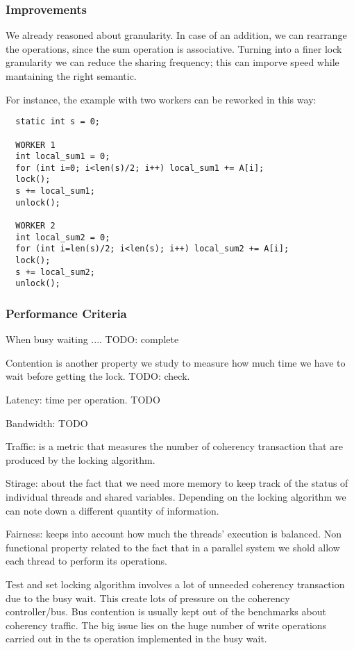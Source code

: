 \subsubsection{Improvements}
We already reasoned about granularity. In case of an addition, we can rearrange the operations, since the sum operation is associative.
Turning into a finer lock granularity we can reduce the sharing frequency; this can imporve speed while mantaining the right semantic.

For instance, the example with two workers can be reworked in this way:
\begin{verbatim}
  static int s = 0;

  WORKER 1
  int local_sum1 = 0;
  for (int i=0; i<len(s)/2; i++) local_sum1 += A[i];  
  lock();
  s += local_sum1;
  unlock();

  WORKER 2
  int local_sum2 = 0;
  for (int i=len(s)/2; i<len(s); i++) local_sum2 += A[i];  
  lock();
  s += local_sum2;
  unlock();

\end{verbatim}

\subsubsection{Performance Criteria}
When busy waiting .... TODO: complete

Contention is another property we study to measure how much time we have to wait before getting the lock. TODO: check.

Latency: time per operation. TODO

Bandwidth: TODO

Traffic: is a metric that measures the number of coherency transaction that are produced by the locking algorithm.

Stirage: about the fact that we need more memory to keep track of the status of individual threads and shared variables.
Depending on the locking algorithm we can note down a different quantity of information.

Fairness: keeps into account how much the threads' execution is balanced.
Non functional property related to the fact that in a parallel system we shold allow each thread to perform its operations.

Test and set locking algorithm involves a lot of unneeded coherency transaction due to the busy wait.
This create lots of pressure on the coherency controller/bus. Bus contention is usually kept out of the benchmarks about coherency traffic.
The big issue lies on the huge number of write operations carried out in the ts operation implemented in the busy wait.

